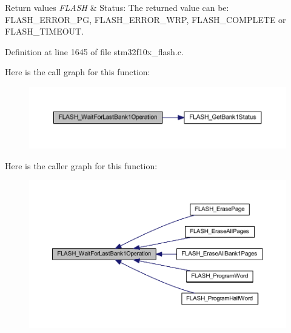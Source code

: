 \begin{DoxyRetVals}{Return values}
{\em F\+L\+A\+SH} & Status\+: The returned value can be\+: F\+L\+A\+S\+H\+\_\+\+E\+R\+R\+O\+R\+\_\+\+PG, F\+L\+A\+S\+H\+\_\+\+E\+R\+R\+O\+R\+\_\+\+W\+RP, F\+L\+A\+S\+H\+\_\+\+C\+O\+M\+P\+L\+E\+TE or F\+L\+A\+S\+H\+\_\+\+T\+I\+M\+E\+O\+UT. \\
\hline
\end{DoxyRetVals}


Definition at line 1645 of file stm32f10x\+\_\+flash.\+c.

Here is the call graph for this function\+:
\nopagebreak
\begin{figure}[H]
\begin{center}
\leavevmode
\includegraphics[width=350pt]{group___f_l_a_s_h___exported___functions_ga470d345c2ea4304f899aa988bdd23824_cgraph}
\end{center}
\end{figure}
Here is the caller graph for this function\+:
\nopagebreak
\begin{figure}[H]
\begin{center}
\leavevmode
\includegraphics[width=350pt]{group___f_l_a_s_h___exported___functions_ga470d345c2ea4304f899aa988bdd23824_icgraph}
\end{center}
\end{figure}
\mbox{\label{group___f_l_a_s_h___exported___functions_ga2ad803999ae93ec03700983c59cae264}} 
